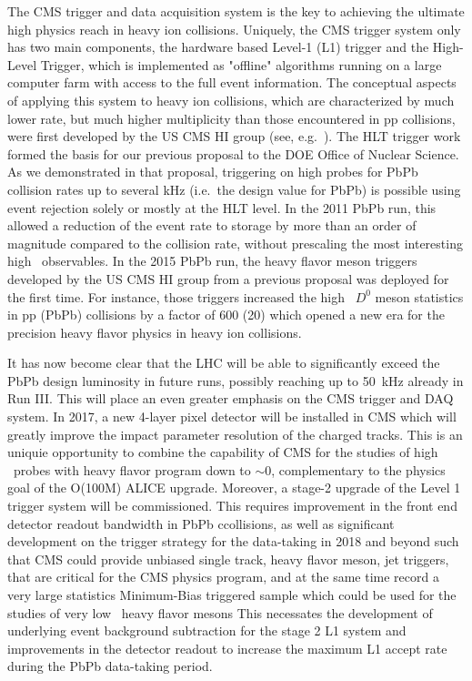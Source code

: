 The CMS trigger and data acquisition system is the key to achieving the ultimate high \pt physics reach in heavy ion collisions.
Uniquely, the CMS trigger system only has two main components, the hardware based Level-1 (L1) trigger and the High-Level Trigger,
which is implemented as "offline" algorithms running on a large computer farm with access to the full event information.  
The conceptual aspects of applying this system to heavy ion collisions, which are characterized by much lower rate, but much higher multiplicity than those encountered in pp collisions, were first developed by the US CMS HI group (see, e.g.\ \cite{Roland:2007is}). The HLT trigger work 
formed the basis for our previous proposal to the DOE Office of Nuclear Science. As we demonstrated in that proposal, triggering on high \pt probes for PbPb collision rates up to several kHz (i.e.\ the design value for PbPb) is possible using event rejection 
solely or mostly at the HLT level. In the 2011 PbPb run, this allowed a reduction of the event rate to storage by more than
an order of magnitude compared to the collision rate, without prescaling the most interesting high \pt\ observables. In the 2015 PbPb run, the heavy flavor meson triggers developed by the US CMS HI group from a previous proposal was deployed for the first time. For instance, those triggers increased the high \pt\ $D^0$ meson statistics in pp (PbPb) collisions by a factor of 600 (20) which opened a new era for the precision heavy flavor physics in heavy ion collisions.

It has now become clear that the LHC will be able to significantly exceed the PbPb design luminosity in future runs, possibly reaching up to 50~kHz already in Run III. This will place an even greater emphasis on the CMS trigger and DAQ system. 
In 2017, a new 4-layer pixel detector will be installed in CMS which will greatly improve the impact parameter resolution of the charged tracks. This is an uniquie opportunity to combine the capability of CMS for the studies of high \pt\ probes with heavy flavor program down to \pt$\sim 0$, complementary to the physics goal of the O(100M) ALICE upgrade. Moreover, a stage-2 upgrade of the Level 1 trigger system will be commissioned. This requires improvement in the front end detector readout bandwidth in PbPb ccollisions, as well as significant development on the trigger strategy for the data-taking in 2018 and beyond such that CMS could provide unbiased single track, heavy flavor meson, jet triggers, that are critical for the CMS physics program, and at the same time record a very large statistics Minimum-Bias triggered sample which could be used for the studies of very low \pt\ heavy flavor mesons This necessates the development of underlying event background subtraction for the stage 2 L1 system and improvements in the detector readout to increase the maximum L1 accept rate during the PbPb data-taking period.

